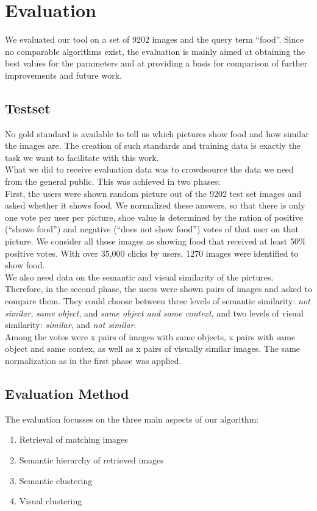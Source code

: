 %
\section{Evaluation}
\label{sec_literatur}

We evaluated our tool on a set of 9202  images and the query term ``food''. Since no comparable algorithms exist, the evaluation is mainly aimed at obtaining the best values for the parameters and at providing a basis for comparison of further improvements and future work.

\subsection{Testset}
No gold standard is available to tell us which pictures show food and how similar the images are. The creation of such standards and training data is exactly the task we want to facilitate with this work.\\ 
What we did to receive evaluation data was to crowdsource the data we need from the general public. This was achieved in two phases:\\

First, the users were shown random picture out of the 9202 test set images and asked whether it shows food. We normalized these answers, so that there is only one vote per user per picture, shoe value is determined by the ration of positive (``shows food'') and negative (``does not show food'') votes of that user on that picture. We consider all those images as showing food that received at least 50\% positive votes. With over 35,000 clicks by  users, 1270 images were identified to show food. \\

We also need data on the semantic and visual similarity of the pictures. Therefore, in the second phase, the users were shown pairs of images and asked to compare them. They could choose between three levels of semantic similarity: \emph{not similar}, \emph{same object}, and \emph{same object and same context}, and two levels of visual similarity: \emph{similar}, and \emph{not similar}.\\
Among the  votes were x pairs of images with same objects, x pairs with same object and same contex, as well as x pairs of visually similar images. The same normalization as in the first phase was applied.

\subsection{Evaluation Method}
The evaluation focusses on the three main aspects of our algorithm:
\begin{enumerate}
\item Retrieval of matching images
\item Semantic hierarchy of retrieved images
\item Semantic clustering
\item Visual clustering
\end{enumerate}

